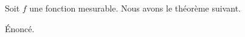 Soit $f$ une fonction mesurable. Nous avons le théorème suivant.
\begin{theorem} %
  Énoncé.
\end{theorem}
